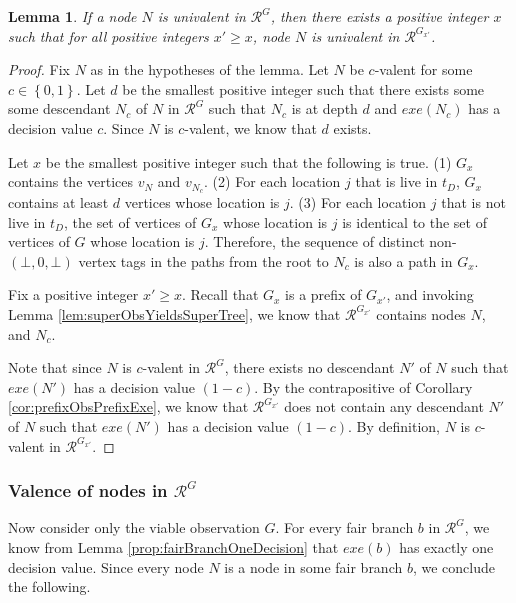 \documentclass[11pt]{article}
\numberwithin{theorem}{section}
\newtheorem{lemma}[theorem]{Lemma}
\newcommand{\set}[1]{\left\{#1\right\}}
\begin{document}
\begin{lemma}\label{lem:univalentNodeFiniteTimeInAllGs}
If a node $N$ is univalent in $\mathcal{R}^{G}$, then there exists a positive integer $x$ such that for all positive integers $x' \geq x$, node $N$ is univalent in $\mathcal{R}^{G_{x'}}$.
\end{lemma}
\begin{proof}
Fix $N$ as in the hypotheses of the lemma. Let $N$ be $c$-valent for some $c \in \set{0,1}$.
Let $d$ be the smallest positive integer such that there exists some some descendant $N_c$ of $N$ in $\mathcal{R}^{G}$ such that $N_c$ is at depth $d$ and $exe(N_c)$ has a decision value $c$. Since $N$ is $c$-valent, we know that $d$ exists. 

Let $x$ be the smallest positive integer such that the following is true. (1) $G_x$ contains the vertices $v_N$ and $v_{N_{c}}$. (2) For each location $j$ that is live in $t_D$, $G_x$ contains at least $d$ vertices whose location is $j$. (3) For each location $j$ that is not live in $t_D$, the set of vertices of $G_x$ whose location is $j$ is identical to the set of vertices of $G$ whose location is $j$. Therefore, the sequence of distinct non-$(\bot, 0, \bot)$ vertex tags in the paths from the root to $N_c$ is also a path in $G_x$.

Fix a positive integer $x'\geq x$. Recall that $G_x$ is a prefix of $G_{x'}$, and invoking Lemma \ref{lem:superObsYieldsSuperTree}, we know that $\mathcal{R}^{G_{x'}}$ contains nodes $N$, and $N_{c}$.


Note that since $N$ is $c$-valent in $\mathcal{R}^{G}$, there exists no descendant $N'$ of $N$ such that $exe(N')$ has a decision value $(1-c)$. By the contrapositive of  Corollary \ref{cor:prefixObsPrefixExe}, we know that $\mathcal{R}^{G_{x'}}$ does not contain any descendant $N'$ of $N$ such that $exe(N')$ has a decision value $(1-c)$. By definition, $N$ is $c$-valent in $\mathcal{R}^{G_{x'}}$.
\end{proof}

\subsubsection{Valence of nodes in $\mathcal{R}^{G}$}

Now consider only the viable observation $G$. For every fair branch $b$ in $\mathcal{R}^G$, we know from Lemma
\ref{prop:fairBranchOneDecision} that $exe(b)$ has exactly one
decision value. Since every node $N$ is a node in some fair branch
$b$, we conclude the following.
\end{document}
